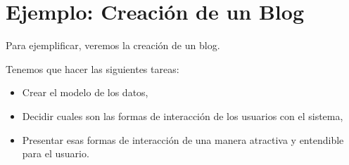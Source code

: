 \documentclass[a4paper,10pt]{article}
\begin{document}
\section{Ejemplo: Creación de un Blog}
Para ejemplificar, veremos la creación de un blog.

Tenemos que hacer las siguientes tareas:
\begin{itemize}
\item Crear el modelo de los datos,
\item Decidir cuales son las formas de interacción de los usuarios con el sistema,
\item Presentar esas formas de interacción de una manera atractiva y entendible para el usuario.
\end{itemize}




\end{document}
